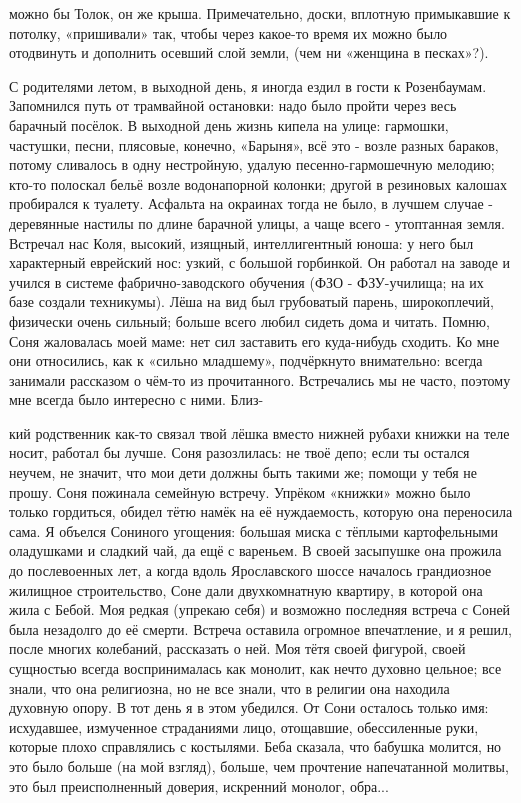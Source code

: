 \label{31-1}
можно бы Толок, он же крыша. Примечательно, доски, вплотную примыкавшие к потолку, «пришивали» так, чтобы через какое-то время их можно было отодвинуть и дополнить осевший слой земли, (чем ни «женщина в песках»?).

\label{31-2}
С родителями летом, в выходной день, я иногда ездил в гости к Розенбаумам. Запомнился путь от трамвайной остановки: надо было пройти через весь барачный посёлок. В выходной день жизнь кипела на улице: гармошки, частушки, песни, плясовые, конечно, «Барыня», всё это - возле разных бараков, потому сливалось в одну нестройную, удалую песенно-гармошечную мелодию; кто-то полоскал бельё возле водонапорной колонки; другой в резиновых калошах пробирался к туалету. Асфальта на окраинах тогда не было, в лучшем случае - деревянные настилы по длине барачной улицы, а чаще всего - утоптанная земля. Встречал нас Коля, высокий, изящный, интеллигентный юноша: у него был характерный еврейский нос: узкий, с большой горбинкой. Он работал на заводе и учился в системе фабрично-заводского обучения (ФЗО - ФЗУ-училища; на их базе создали техникумы). Лёша на вид был грубоватый парень, широкоплечий, физически очень сильный; больше всего любил сидеть дома и читать. Помню, Соня жаловалась моей маме: нет сил заставить его куда-нибудь сходить. Ко мне они относились, как к «сильно младшему», подчёркнуто внимательно: всегда занимали рассказом о чём-то из прочитанного. Встречались мы не часто, поэтому мне всегда было интересно с ними. Близ-

\label{32-1}
кий родственник как-то связал твой лёшка вместо нижней рубахи книжки на теле носит, работал бы лучше. Соня разозлилась: не твоё депо; если ты остался неучем, не значит, что мои дети должны быть такими же; помощи у тебя не прошу. Соня пожинала семейную встречу. Упрёком «книжки» можно было только гордиться, обидел тётю намёк на её нуждаемость, которую она переносила сама. Я объелся Сониного угощения: большая миска с тёплыми картофельными оладушками и сладкий чай, да ещё с вареньем. В своей засыпушке она прожила до послевоенных лет, а когда вдоль Ярославского шоссе началось грандиозное жилищное строительство, Соне дали двухкомнатную квартиру, в которой она жила с Бебой. Моя редкая (упрекаю себя) и возможно последняя встреча с Соней была незадолго до её смерти. Встреча оставила огромное впечатление, и я решил, после многих колебаний, рассказать о ней. Моя тётя своей фигурой, своей сущностью всегда воспринималась как монолит, как нечто духовно цельное; все знали, что она религиозна, но не все знали, что в религии она находила духовную опору. В тот день я в этом убедился. От Сони осталось только имя: исхудавшее, измученное страданиями лицо, отощавшие, обессиленные руки, которые плохо справлялись с костылями. Беба сказала, что бабушка молится, но это было больше (на мой взгляд), больше, чем прочтение напечатанной молитвы, это был преисполненный доверия, искренний монолог, обра...

